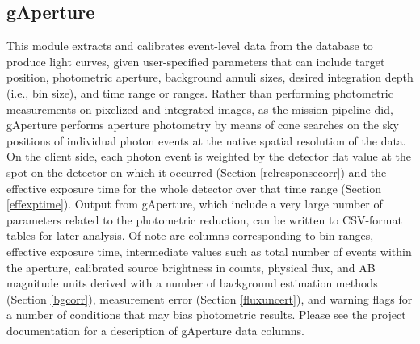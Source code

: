 \documentclass[preprint]{aastex}
\begin{document}
\subsection{gAperture}
This module extracts and calibrates event-level data from the database to produce light curves, given user-specified parameters that can include target position, photometric aperture, background annuli sizes, desired integration depth (i.e., bin size), and time range or ranges. Rather than performing photometric measurements on pixelized and integrated images, as the mission pipeline did, gAperture performs aperture photometry by means of cone searches on the sky positions of individual photon events at the native spatial resolution of the data. On the client side, each photon event is weighted by the detector flat value at the spot on the detector on which it occurred (Section \ref{relresponsecorr}) and the effective exposure time for the whole detector over that time range (Section \ref{effexptime}). Output from gAperture, which include a very large number of parameters related to the photometric reduction, can be written to CSV-format tables for later analysis. Of note are columns corresponding to bin ranges, effective exposure time, intermediate values such as total number of events within the aperture, calibrated source brightness in counts, physical flux, and AB magnitude units derived with a number of background estimation methods (Section \ref{bgcorr}), measurement error (Section \ref{fluxuncert}), and warning flags for a number of conditions that may bias photometric results. Please see the project documentation for a description of gAperture data columns.
\end{document}
